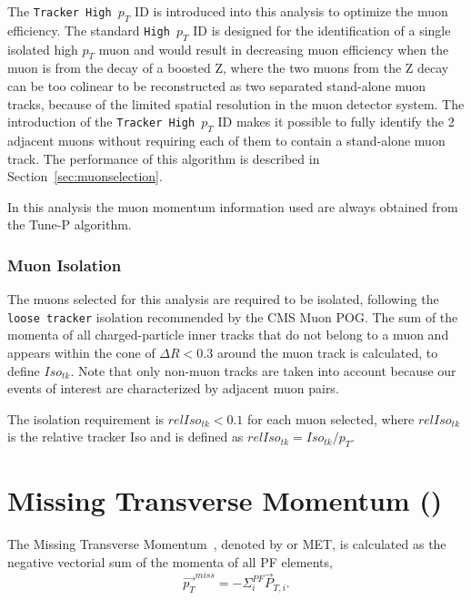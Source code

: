 The \texttt{Tracker High $p_T$} ID is introduced into this analysis to optimize the muon efficiency. The standard \texttt{High $p_T$} ID is designed for the identification of a single isolated high $p_T$ muon and would result in decreasing muon efficiency when the muon is from the decay of a boosted Z, where the two muons from the Z decay can be too colinear to be reconstructed as two separated stand-alone muon tracks, because of the limited spatial resolution in the muon detector system. The introduction of the \texttt{Tracker High $p_T$} ID makes it possible to fully identify the 2 adjacent muons without requiring each of them to contain a stand-alone muon track. The performance of this algorithm is described in Section~\ref{sec:muonselection}.

\vspace{0.3cm}
In this analysis the muon momentum information used are always obtained from the Tune-P algorithm.

\subsubsection{Muon Isolation}
The muons selected for this analysis are required to be isolated, following the \texttt{loose tracker} isolation recommended by the CMS Muon POG. The sum of the momenta of all charged-particle inner tracks that do not belong to a muon and appears within the cone of $\Delta R<0.3$ around the muon track is calculated, to define $Iso_{tk}$. Note that only non-muon tracks are taken into account because our events of interest are characterized by adjacent muon pairs.

\vspace{0.3cm}
The isolation requirement is $relIso_{tk}<0.1$ for each muon selected, where $relIso_{tk}$ is the relative tracker Iso and is defined as $relIso_{tk}=Iso_{tk}/p_{T}$.

\section{Missing Transverse Momentum (\boldmath{\ptmiss})}
The Missing Transverse Momentum~\cite{ob_metconst}, denoted by \ptmiss or MET, is calculated as the negative vectorial sum of the momenta of all PF elements,
\begin{equation}
\vec{p_T} ^{miss} = -\Sigma_{i}^{PF} \vec{P}_{T,i}.
\label{eqn:ob_metdef}
\end{equation}

